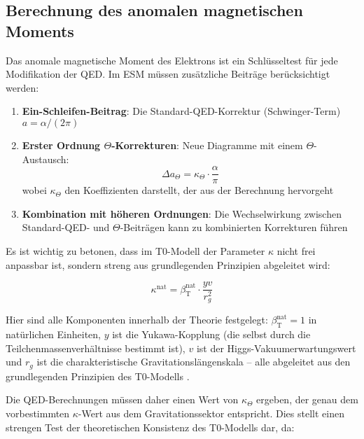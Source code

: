 \documentclass[12pt,a4paper]{article}
\newcommand{\betaT}{\beta_{\text{T}}}
\begin{document}
	\subsection{Berechnung des anomalen magnetischen Moments}
	\label{subsec:magnetic_moment}
	
	Das anomale magnetische Moment des Elektrons ist ein Schlüsseltest für jede Modifikation der QED. Im ESM müssen zusätzliche Beiträge berücksichtigt werden:
	
	\begin{enumerate}
		\item \textbf{Ein-Schleifen-Beitrag}: Die Standard-QED-Korrektur (Schwinger-Term) $a = \alpha/(2\pi)$
		\item \textbf{Erster Ordnung $\Theta$-Korrekturen}: Neue Diagramme mit einem $\Theta$-Austausch:
		\begin{equation}
			\Delta a_{\Theta} = \kappa_{\Theta} \cdot \frac{\alpha}{\pi}
			\label{eq:theta_correction}
		\end{equation}
		wobei $\kappa_{\Theta}$ den Koeffizienten darstellt, der aus der Berechnung hervorgeht
		\item \textbf{Kombination mit höheren Ordnungen}: Die Wechselwirkung zwischen Standard-QED- und $\Theta$-Beiträgen kann zu kombinierten Korrekturen führen
	\end{enumerate}
	
	Es ist wichtig zu betonen, dass im T0-Modell der Parameter $\kappa$ nicht frei anpassbar ist, sondern streng aus grundlegenden Prinzipien abgeleitet wird:
	
	\begin{equation}
		\kappa^{\text{nat}} = \betaT^{\text{nat}} \cdot \frac{yv}{r_g^2}
	\end{equation}
	
	Hier sind alle Komponenten innerhalb der Theorie festgelegt: $\betaT^{\text{nat}} = 1$ in natürlichen Einheiten, $y$ ist die Yukawa-Kopplung (die selbst durch die Teilchenmassenverhältnisse bestimmt ist), $v$ ist der Higgs-Vakuumerwartungswert und $r_g$ ist die charakteristische Gravitationslängenskala – alle abgeleitet aus den grundlegenden Prinzipien des T0-Modells \cite{pascher_params_2025, pascher_alphabeta_2025}.
	
	Die QED-Berechnungen müssen daher einen Wert von $\kappa_{\Theta}$ ergeben, der genau dem vorbestimmten $\kappa$-Wert aus dem Gravitationssektor entspricht. Dies stellt einen strengen Test der theoretischen Konsistenz des T0-Modells dar, da:
	
\end{document}
